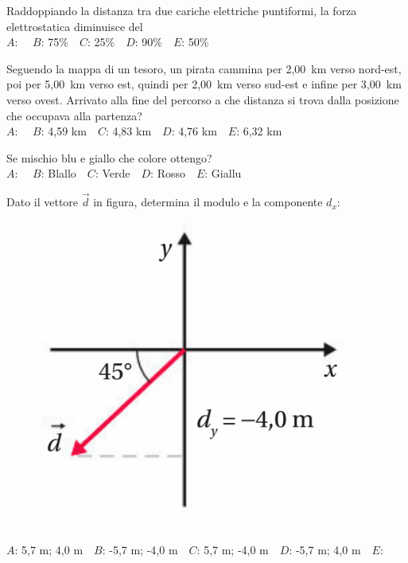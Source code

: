 \mcquestionfooter



\def\mcquestionnumber{7}


\mcquestionheader Raddoppiando la distanza tra due cariche elettriche puntiformi, la forza elettrostatica diminuisce del\\
{$A$}: \ \ {$B$}: 75\%\ \ {$C$}: 25\%\ \ {$D$}: 90\%\ \ {$E$}: 50\%\ \ 

\mcquestionfooter



\def\mcquestionnumber{8}


\mcquestionheader Seguendo la mappa di un tesoro, un pirata cammina per 2,00~km verso nord-est, poi per 5,00~km verso est, quindi per 2,00~km verso sud-est e infine per 3,00~km verso ovest. Arrivato alla fine del percorso a che distanza si trova dalla posizione che occupava alla partenza?\\
{$A$}: \ \ {$B$}: 4,59 km\ \ {$C$}: 4,83 km\ \ {$D$}: 4,76 km\ \ {$E$}: 6,32 km\ \ 

\mcquestionfooter



\def\mcquestionnumber{9}


\mcquestionheader Se mischio blu e giallo che colore ottengo?\\
{$A$}: \ \ {$B$}: Blallo\ \ {$C$}: Verde\ \ {$D$}: Rosso\ \ {$E$}: Giallu\ \ 

\mcquestionfooter



\def\mcquestionnumber{10}


\mcquestionheader Dato il vettore $\vec{d}$ in figura, determina il modulo e la componente $d_x$: \begin{figure}[h!]   \begin{center}     \includegraphics[scale=0.35]{vettored.png}   \end{center} \end{figure}\\
{$A$}: 5,7 m; 4,0 m\ \ {$B$}: -5,7 m; -4,0 m\ \ {$C$}: 5,7 m; -4,0 m\ \ {$D$}: -5,7 m; 4,0 m\ \ {$E$}: \ \ 

